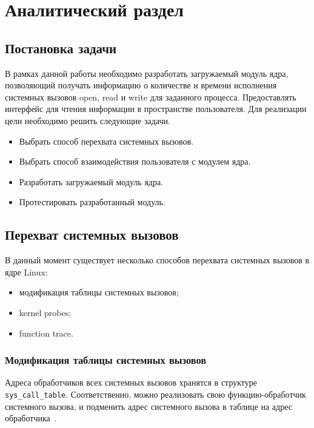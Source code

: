 \chapter{Аналитический раздел}

\section{Постановка задачи}

В рамках данной работы необходимо разработать загружаемый модуль ядра, позволяющий получать информацию о количестве и времени исполнения системных вызовов open, read и write для заданного процесса. Предоставлять интерфейс для чтения информации в пространстве пользователя. Для реализации цели необходимо решить следующие задачи.

\begin{itemize}
	\item Выбрать способ перехвата системных вызовов.
	\item Выбрать способ взаимодействия пользователя с модулем ядра.
	\item Разработать загружаемый модуль ядра.
	\item Протестировать разработанный модуль.
\end{itemize}

\section{Перехват системных вызовов}

В данный момент существует несколько способов перехвата системных вызовов в ядре Linux:

\begin{itemize}
	\item модификация таблицы системных вызовов;
	\item kernel probes;
	\item function trace.
\end{itemize}

\subsection{Модификация таблицы системных вызовов}

Адреса обработчиков всех системных вызовов хранятся в структуре \texttt{sys\_call\_table}. Соответственно, можно реализовать свою функцию-обработчик системного вызова, и подменить адрес системного вызова в таблице на адрес обработчика~\cite{syscall_table}. 

